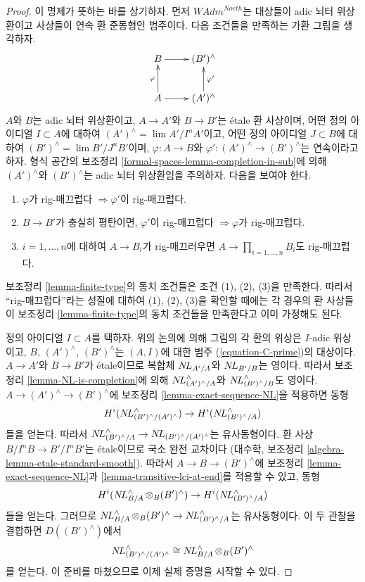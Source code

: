 \begin{proof}
이 명제가 뜻하는 바를 상기하자. 먼저 $\textit{WAdm}^{Noeth}$는
대상들이 adic 뇌터 위상환이고 사상들이 연속 환 준동형인 범주이다.
다음 조건들을 만족하는 가환 그림을 생각하자.
$$
\xymatrix{
B \ar[r] & (B')^\wedge \\
A \ar[r] \ar[u]^\varphi & (A')^\wedge \ar[u]_{\varphi'}
}
$$
$A$와 $B$는 adic 뇌터 위상환이고,
$A \to A'$와 $B \to B'$는 \'etale 환 사상이며,
어떤 정의 아이디얼 $I \subset A$에 대하여
$(A')^\wedge = \lim A'/I^nA'$이고,
어떤 정의 아이디얼 $J \subset B$에 대하여
$(B')^\wedge = \lim B'/J^nB'$이며,
$\varphi : A \to B$와 $\varphi' : (A')^\wedge \to (B')^\wedge$는 연속이라고 하자.
형식 공간의 보조정리 \ref{formal-spaces-lemma-completion-in-sub}에 의해
$(A')^\wedge$와 $(B')^\wedge$는 adic 뇌터 위상환임을 주의하자.
다음을 보여야 한다.
\begin{enumerate}
\item $\varphi$가 rig-매끄럽다 $\Rightarrow \varphi'$이 rig-매끄럽다.
\item $B \to B'$가 충실히 평탄이면, $\varphi'$이 rig-매끄럽다
$\Rightarrow \varphi$가 rig-매끄럽다.
\item $i = 1, \ldots, n$에 대하여 $A \to B_i$가 rig-매끄러우면
$A \to \prod_{i = 1, \ldots, n} B_i$도 rig-매끄럽다.
\end{enumerate}
보조정리 \ref{lemma-finite-type}의 동치 조건들은 조건 (1), (2), (3)을 만족한다.
따라서 ``rig-매끄럽다''라는 성질에 대하여 (1), (2), (3)을 확인할 때에는
각 경우의 환 사상들이 보조정리 \ref{lemma-finite-type}의 동치 조건들을
만족한다고 이미 가정해도 된다.

\medskip\noindent
정의 아이디얼 $I \subset A$를 택하자. 위의 논의에 의해 그림의 각 환의 위상은
$I$-adic 위상이고, $B$, $(A')^\wedge$, $(B')^\wedge$는
$(A, I)$에 대한 범주 (\ref{equation-C-prime})의 대상이다.
$A \to A'$와 $B \to B'$가 \'etale이므로 복합체
$\mathop{N\!L}\nolimits_{A'/A}$와 $\mathop{N\!L}\nolimits_{B'/B}$는 영이다. 따라서 보조정리
\ref{lemma-NL-is-completion}에 의해
$\mathop{N\!L}\nolimits_{(A')^\wedge/A}^\wedge$와 $\mathop{N\!L}\nolimits_{(B')^\wedge/B}^\wedge$도 영이다.
$A \to (A')^\wedge \to (B')^\wedge$에 보조정리
\ref{lemma-exact-sequence-NL}을 적용하면 동형
$$
H^i(\mathop{N\!L}\nolimits_{(B')^\wedge/(A')^\wedge}^\wedge) \to H^i(\mathop{N\!L}\nolimits_{(B')^\wedge/A}^\wedge)
$$
들을 얻는다. 따라서
$\mathop{N\!L}\nolimits_{(B')^\wedge/A}^\wedge \to \mathop{N\!L}\nolimits_{(B')^\wedge/(A')^\wedge}$는
유사동형이다.
환 사상 $B/I^nB \to B'/I^nB'$는 \'etale이므로 국소 완전 교차이다
(대수학, 보조정리 \ref{algebra-lemma-etale-standard-smooth}).
따라서 $A \to B \to (B')^\wedge$에 보조정리
\ref{lemma-exact-sequence-NL}과
\ref{lemma-transitive-lci-at-end}를 적용할 수 있고, 동형
$$
H^i(\mathop{N\!L}\nolimits_{B/A}^\wedge \otimes_B (B')^\wedge) \to
H^i(\mathop{N\!L}\nolimits_{(B')^\wedge/A}^\wedge)
$$
들을 얻는다. 그러므로
$\mathop{N\!L}\nolimits_{B/A}^\wedge \otimes_B (B')^\wedge \to \mathop{N\!L}\nolimits_{(B')^\wedge/A}^\wedge$는
유사동형이다. 이 두 관찰을 결합하면 $D((B')^\wedge)$에서
$$
\mathop{N\!L}\nolimits_{(B')^\wedge/(A')^\wedge}^\wedge \cong
\mathop{N\!L}\nolimits_{B/A}^\wedge \otimes_B (B')^\wedge
$$
를 얻는다. 이 준비를 마쳤으므로 이제 실제 증명을 시작할 수 있다.


\end{proof}
